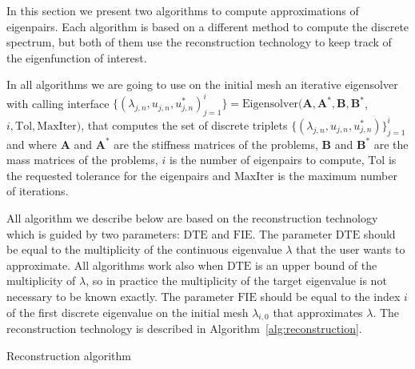 \documentclass[smallextended]{svjour3}
\begin{document}
In this section we present two algorithms to compute approximations of eigenpairs. Each algorithm is based on a different method to compute the discrete spectrum, but both of them use the reconstruction technology to keep track of the eigenfunction of interest.

In all algorithms we are going to use on the initial mesh an iterative eigensolver with calling interface
$\{(\lambda_{j,n},u_{j,n},u_{j,n}^*)_{j=1}^{i}\}=\mathrm{Eigensolver}(\mathbf{A},
\mathbf{A}^*,\mathbf{B},\mathbf{B}^*$, $i,\mathrm{Tol},\mathrm{MaxIter})$, that computes the set of discrete triplets $\{(\lambda_{j,n},u_{j,n},u_{j,n}^*)\}_{j=1}^{i}$ and where $\mathbf{A}$ and $\mathbf{A}^*$ are the stiffness matrices of the problems, $\mathbf{B}$ and $\mathbf{B}^*$ are the mass matrices of the problems, $i$ is the number of eigenpairs to compute, $\mathrm{Tol}$ is the requested tolerance for the eigenpairs and $\mathrm{MaxIter}$ is the maximum number of iterations. 


All algorithm we describe below are based on the reconstruction technology which is guided by two parameters: $\mathrm{DTE}$ and $\mathrm{FIE}$. The parameter $\mathrm{DTE}$ should be equal to the multiplicity of the continuous eigenvalue $\lambda$ that the user wants to approximate. All algorithms work also when $\mathrm{DTE}$ is an upper bound of the multiplicity of $\lambda$, so in practice the multiplicity of the target eigenvalue is not necessary to be known exactly. The parameter $\mathrm{FIE}$ should be equal to the index $i$ of the first discrete eigenvalue on the initial mesh $\lambda_{i,0}$ that approximates $\lambda$. The reconstruction technology is described in Algorithm~\eqref{alg:reconstruction}.

\begin{algorithm}[!ht] \caption{Reconstruction algorithm} \label{alg:reconstruction} 
\begin{algorithmic}





\end{algorithmic}
\end{algorithm}
\end{document}
